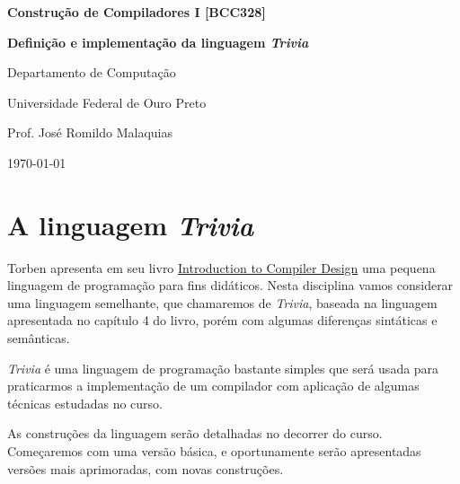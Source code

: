 \documentclass[a4paper,11pt,brazil]{article}
\newcommand{\lang}{\textsl{Trivia}}
\begin{document}
\begin{center}
  \textbf{Construção de Compiladores I [BCC328]}
\end{center}
\begin{tcolorbox}[colback=yellow!20]
  \begin{center}
    \textbf{\Large Definição e implementação da linguagem \lang{}}\\[1em]
  \end{center}
\end{tcolorbox}
\begin{center}
  Departamento de Computação\par
  Universidade Federal de Ouro Preto\par
  Prof. José Romildo Malaquias\par
  \today
\end{center}

\begin{abstract}
  \lang{} é uma pequena linguagem de programação usada para fins
  didáticos na aprendizagem de técnicas de construção de
  compiladores.
  
  A documentação e implementação de \lang{} será realizada de forma
  colaborativa pelos participantes do curso.
\end{abstract}

\tableofcontents

\section{A linguagem \lang{}}

Torben apresenta em seu livro
\href{https://www.springer.com/gp/book/9783319669656}{Introduction to
  Compiler Design} uma pequena linguagem de programação para fins
didáticos. Nesta disciplina vamos considerar uma linguagem semelhante,
que chamaremos de \lang{}, baseada na linguagem apresentada no
capítulo 4 do livro, porém com algumas diferenças sintáticas e
semânticas.

\lang{} é uma linguagem de programação bastante simples que será usada
para praticarmos a implementação de um compilador com aplicação de
algumas técnicas estudadas no curso.

As construções da linguagem serão detalhadas no decorrer do
curso. Começaremos com uma versão básica, e oportunamente serão
apresentadas versões mais aprimoradas, com novas construções.
\end{document}
